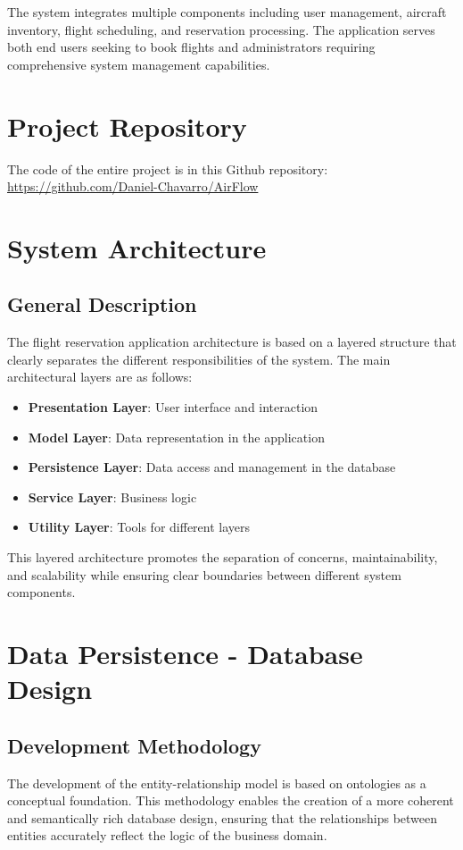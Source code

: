 \documentclass[conference]{IEEEtran}
\begin{document}
    The system integrates multiple components including user management, aircraft inventory, flight scheduling, and reservation processing. The application serves both end users seeking to book flights and administrators requiring comprehensive system management capabilities.

    \section{Project Repository}
    The code of the entire project is in this Github repository:\\
    \url{https://github.com/Daniel-Chavarro/AirFlow}

    \section{System Architecture}

    \subsection{General Description}
    The flight reservation application architecture is based on a layered structure that clearly separates the different responsibilities of the system. The main architectural layers are as follows:

    \begin{itemize}
        \item \textbf{Presentation Layer}: User interface and interaction
        \item \textbf{Model Layer}: Data representation in the application
        \item \textbf{Persistence Layer}: Data access and management in the database
        \item \textbf{Service Layer}: Business logic
        \item \textbf{Utility Layer}: Tools for different layers \end{itemize}

    This layered architecture promotes the separation of concerns, maintainability, and scalability while ensuring clear boundaries between different system components.

    \section{Data Persistence - Database Design}

    \subsection{Development Methodology}
    The development of the entity-relationship model is based on ontologies as a conceptual foundation. This methodology enables the creation of a more coherent and semantically rich database design, ensuring that the relationships between entities accurately reflect the logic of the business domain.
\end{document}
